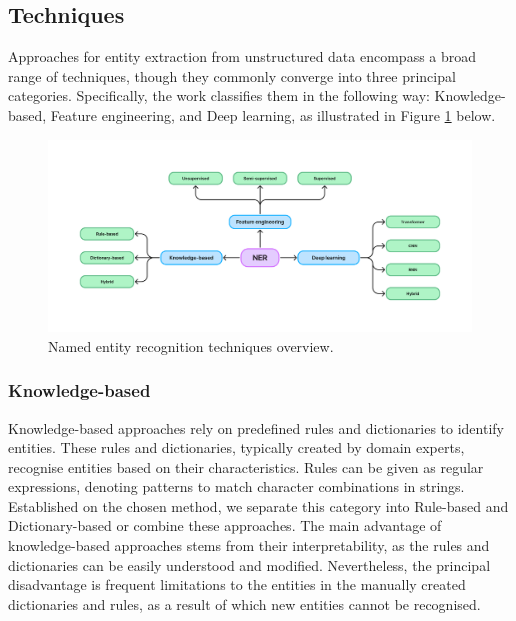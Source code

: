\subsection{Techniques}
\label{subsec:Techniques}
Approaches for entity extraction from unstructured data encompass a broad range of techniques, though they commonly converge into three principal categories. Specifically, the work \parencite{keraghel2024survey} classifies them in the following way: Knowledge-based, Feature engineering, and Deep learning, as illustrated in Figure \ref{fig:named-entity-recognition-methods} below.

\begin{figure}[htbp]
    \centering
    \includegraphics[width=\textwidth]{img/theoretical/ner-methods.pdf}
    \caption{Named entity recognition techniques overview.}
    \label{fig:named-entity-recognition-methods}
\end{figure}

\subsubsection*{Knowledge-based}
\label{subsubsec:knowledge-based}
Knowledge-based approaches rely on predefined rules and dictionaries to identify entities. These rules and dictionaries, typically created by domain experts, recognise entities based on their characteristics. Rules can be given as regular expressions, denoting patterns to match character combinations in strings. Established on the chosen method, we separate this category into Rule-based and Dictionary-based or combine these approaches. The main advantage of knowledge-based approaches stems from their interpretability, as the rules and dictionaries can be easily understood and modified. Nevertheless, the principal disadvantage is frequent limitations to the entities in the manually created dictionaries and rules, as a result of which new entities cannot be recognised.


